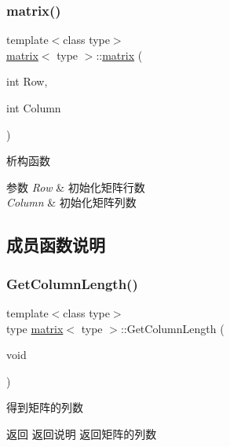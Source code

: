 \subsubsection{\texorpdfstring{matrix()}{matrix()}}
{\footnotesize\ttfamily template$<$class type$>$ \\
\mbox{\hyperlink{classmatrix}{matrix}}$<$ type $>$\+::\mbox{\hyperlink{classmatrix}{matrix}} (\begin{DoxyParamCaption}\item[{int}]{Row,  }\item[{int}]{Column }\end{DoxyParamCaption})\hspace{0.3cm}{\ttfamily [inline]}}



析构函数 


\begin{DoxyParams}{参数}
{\em Row} & 初始化矩阵行数 \\
\hline
{\em Column} & 初始化矩阵列数 \\
\hline
\end{DoxyParams}


\subsection{成员函数说明}
\mbox{\label{classmatrix_aee9fe31d5065ec906cd0ed908cc127a1}} 
\subsubsection{\texorpdfstring{Get\+Column\+Length()}{GetColumnLength()}}
{\footnotesize\ttfamily template$<$class type$>$ \\
type \mbox{\hyperlink{classmatrix}{matrix}}$<$ type $>$\+::Get\+Column\+Length (\begin{DoxyParamCaption}\item[{void}]{ }\end{DoxyParamCaption})\hspace{0.3cm}{\ttfamily [inline]}}



得到矩阵的列数 

\begin{DoxyReturn}{返回}
返回说明 返回矩阵的列数 
\end{DoxyReturn}
\mbox{\label{classmatrix_a24b3678b5a1b638006fc8fe0fd9cc457}} 
